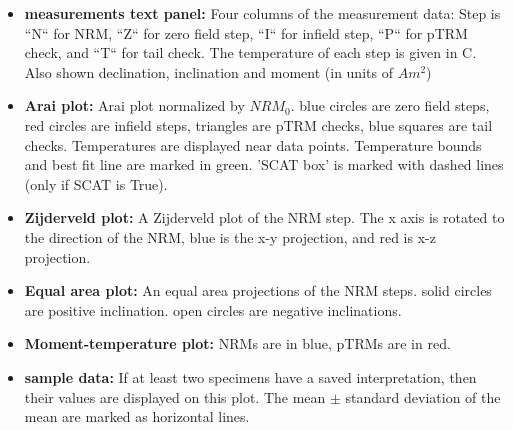 \documentclass[11pt]{book}
\begin{document}
{\begin{itemize}
\item {\bf measurements text panel:} Four columns of the measurement data: Step is ``N`` for NRM, ``Z`` for zero field step, ``I`` for infield step, ``P`` for pTRM check, and ``T`` for tail check. The temperature of each step is given in C. Also shown  declination, inclination and moment (in units of $Am^2$)
\item {\bf Arai plot:}  Arai plot normalized by $NRM_0$. blue circles are zero field steps, red circles are infield steps, triangles are pTRM checks, blue squares are tail checks. Temperatures are displayed near data points. Temperature bounds and best fit line are marked in green. 'SCAT box' is marked with dashed lines (only if SCAT is True).
\item {\bf Zijderveld plot:}  A Zijderveld plot of the NRM step.  The x axis is rotated to the direction of the NRM, blue is the x-y  projection, and red is x-z projection.
\item {\bf Equal area plot:}  An equal area projections  of the NRM steps. solid circles are positive inclination. open circles are negative inclinations.
\item {\bf Moment-temperature plot:}  NRMs are in blue, pTRMs are in red.
\item {\bf sample data:}  If at least two specimens have a saved interpretation, then their values are displayed on this plot. The mean $\pm$ standard deviation of the mean are marked as  horizontal lines.
\end{itemize}

}
\end{document}
